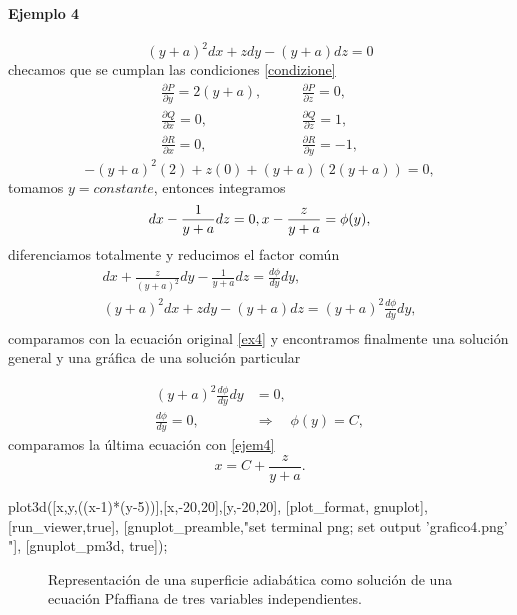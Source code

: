 \documentclass{article}
\theoremstyle{definition} \newtheorem{defi}{Definici\'on}
\theoremstyle{definition} \newtheorem{teo}{Teorema}
\theoremstyle{definition} \newtheorem{cor}{Corolario}
\begin{document}
\paragraph{Ejemplo 4}
\begin{equation}\label{ex4}
(y+a)^2dx+zdy-(y+a)dz=0
\end{equation}
checamos que se cumplan las condiciones \eqref{condizione}
\begin{align*}
\frac{\partial P}{\partial y} = 2(y+a), & \qquad \frac{\partial P}{\partial z} = 0,\\
\frac{\partial Q}{\partial x} = 0, & \qquad \frac{\partial Q}{\partial z} = 1,\\
\frac{\partial R}{\partial x} = 0, & \qquad \frac{\partial R}{\partial y} = -1,
\end{align*}
$$-(y+a)^2(2)+z(0)+(y+a)(2(y+a))=0,$$
tomamos $y=constante$, entonces integramos
\begin{equation*}
dx-\frac{1}{y+a}dz = 0,\\
x-\frac{z}{y+a} = \phi(y)\label{ejem4},
\end{equation*}
diferenciamos totalmente y reducimos el factor com\'un
\begin{align*}
dx+\frac{z}{(y+a)^2}dy-\frac{1}{y+a}dz=\frac{d\phi}{dy}dy,\\
(y+a)^2dx+zdy-(y+a)dz=(y+a)^2\frac{d\phi}{dy}dy,\\
\end{align*}
comparamos con la ecuaci\'on original \eqref{ex4} y encontramos finalmente una soluci\'on general y una gr\'afica de una soluci\'on particular

\begin{align*}
(y+a)^2\frac{d\phi}{dy}dy&=0,\\
\frac{d\phi}{dy}=0, \quad&\Rightarrow \quad \phi(y)=C,
\end{align*}
comparamos la \'ultima ecuaci\'on con \eqref{ejem4}
\begin{equation}
x=C+\frac{z}{y+a}.
\end{equation}
\begin{maximacmd}
   plot3d([x,y,((x-1)*(y-5))],[x,-20,20],[y,-20,20],
    [plot_format, gnuplot],
    [run_viewer,true],
    [gnuplot_preamble,"set terminal png; set output 'grafico4.png' "],
    [gnuplot_pm3d, true]);
\end{maximacmd}
\begin{figure}
\caption{Representaci\'on de una superficie adiab\'atica como soluci\'on de una ecuaci\'on Pfaffiana de tres variables independientes.}
\end{figure}
\end{document}
